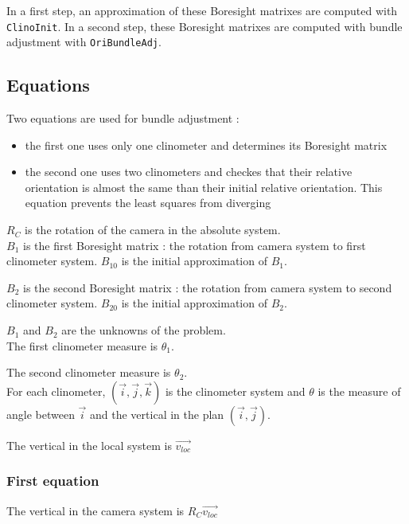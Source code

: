 In a first step, an approximation of these Boresight matrixes are computed with {\tt ClinoInit}. 
In a second step, these Boresight matrixes are computed with bundle adjustment with {\tt OriBundleAdj}.


\subsection{Equations}

Two equations are used for bundle adjustment :
\begin{itemize}
     \item the first one uses only one clinometer and determines its Boresight matrix
     \item the second one uses two clinometers and checkes that their relative orientation is almost the same than their initial relative orientation. 
     This equation prevents the least squares from diverging
\end{itemize}


$R_C$ is the rotation of the camera in the absolute system.\\

$B_1$ is the first Boresight matrix : the rotation from camera system to first clinometer system. $B_{10}$ is the initial approximation of $B_1$.

$B_2$ is the second Boresight matrix : the rotation from camera system to second clinometer system. $B_{20}$ is the initial approximation of $B_2$.

$B_1$ and $B_2$ are the unknowns of the problem.\\

The first clinometer measure is $\theta_1$. 

The second clinometer measure is $\theta_2$. \\

For each clinometer, $(\Vec{i}, \Vec{j}, \Vec{k})$ is the clinometer system and $\theta$ is the measure of angle between $\Vec{i}$ and the vertical in the plan $(\Vec{i}, \Vec{j})$.

The vertical in the local system is $ \Vec{v_{loc}} $ \\


\subsubsection{First equation}

\label{FirstClinoCalibEq}


The vertical in the camera system is $ R_C \Vec{v_{loc}} $

